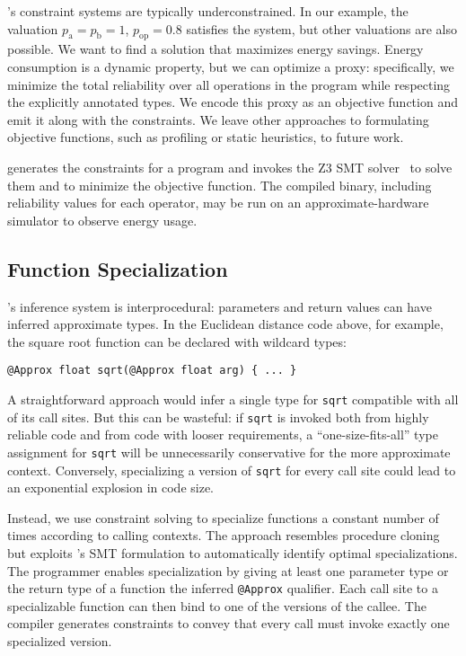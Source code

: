 \documentclass[10pt,nocopyrightspace,preprint]{sigplanconf}
\newcommand{\code}{\lstinline[emphstyle={},keywordstyle={}]}
\begin{document}
\lang's constraint systems are typically underconstrained.
In our example, the valuation $p_\text{a} = p_\text{b} = 1$, $p_\text{op} = 0.8$ satisfies the system, but other
valuations are also possible.
We want to find a solution that maximizes energy savings.
Energy consumption is a dynamic property, but we can optimize a proxy:
specifically, we minimize the total reliability over all operations in the
program while respecting the explicitly annotated types.
We encode this proxy as an objective function and emit it along with the
constraints.
We leave other approaches to formulating objective functions, such as
profiling or static heuristics, to future work.

\lang generates the constraints for a program and invokes the Z3 SMT
solver~\cite{z3} to solve them and to minimize the objective function.
The compiled binary, including reliability values for each operator, may
be run on an approximate-hardware simulator to observe energy usage.

\subsection{Function Specialization}
\label{sec:cloning}

\lang's inference system is interprocedural: parameters and return values can
have inferred approximate types.
In the Euclidean distance code above, for example, the square root function
can be declared with wildcard types:
%
\begin{lstlisting}
@Approx float sqrt(@Approx float arg) { ... }
\end{lstlisting}
%
A straightforward approach would infer a single type for \code{sqrt}
compatible with all of its call sites.
But this can be wasteful:
if \code{sqrt} is invoked both from highly reliable code and from code
with looser requirements, a ``one-size-fits-all'' type assignment
for \code{sqrt} will be unnecessarily conservative for the more approximate
context.
Conversely, specializing a version of \code{sqrt} for every call site could
lead to an exponential explosion in code size.

Instead, we use constraint solving to specialize functions a constant number of
times according to calling contexts.
The approach resembles procedure cloning~\cite{procedurecloning} but exploits
\lang's SMT formulation to automatically identify optimal
specializations.
The programmer enables specialization by giving at least one parameter type
or the return type of a function the inferred \code{@Approx} qualifier.
Each call site to a specializable function can then bind to one of the
versions of the callee.
The \lang compiler generates constraints to convey that every call must
invoke exactly one specialized version.
\end{document}
